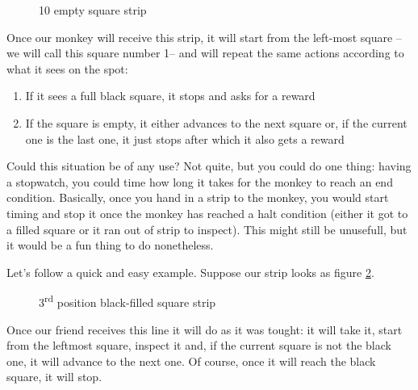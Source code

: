 \documentclass[12pt, a4paper]{book}
\begin{document}
\begin{figure}[h]
  \centering
  \caption{10 empty square strip}  
  \label{fig:empty square strip}
\end{figure}

Once our monkey will receive this strip, it will start from the left-most square --we will call this square number 1-- and will repeat the same actions according to what it sees on the spot:

\begin{enumerate}
  \item If it sees a full black square, it stops and asks for a reward
  \item If the square is empty, it either advances to the next square or, if the current one is the last one, it just stops after which it also gets a reward
\end{enumerate}

Could this situation be of any use? Not quite, but you could do one thing: having a stopwatch, you could time how long it takes for the monkey to reach an end condition. Basically, once you hand in a strip to the monkey, you would start timing and stop it once the monkey has reached a halt condition (either it got to a filled square or it ran out of strip to inspect). This might still be unusefull, but it would be a fun thing to do nonetheless.

Let's follow a quick and easy example. Suppose our strip looks as figure \ref{fig:simple example strip}.

\begin{figure}[h]
  \centering
  \caption{3\textsuperscript{rd} position black-filled square strip}  
  \label{fig:simple example strip}
\end{figure}

Once our friend receives this line it will do as it was tought: it will take it, start from the leftmost square, inspect it and, if the current square is not the black one, it will advance to the next one. Of course, once it will reach the black square, it will stop.
\end{document}
